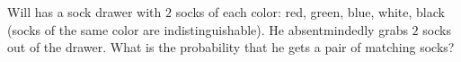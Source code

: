 Will has a sock drawer with $2$ socks of each color: red, green, blue, white, black (socks of the same color are indistinguishable). He absentmindedly grabs $2$ socks out of the drawer. What is the probability that he gets a pair of matching socks?